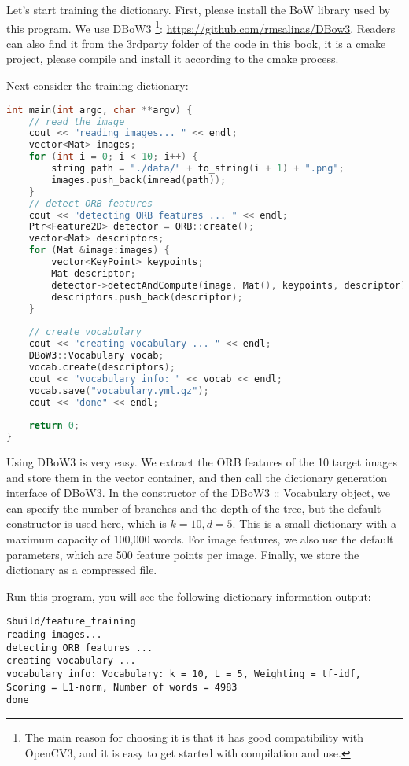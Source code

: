 Let's start training the dictionary. First, please install the BoW library used by this program. We use DBoW3 \footnote{The main reason for choosing it is that it has good compatibility with OpenCV3, and it is easy to get started with compilation and use.}: \url{https://github.com/rmsalinas/DBow3}. Readers can also find it from the 3rdparty folder of the code in this book, it is a cmake project, please compile and install it according to the cmake process.

Next consider the training dictionary:

\begin{lstlisting}[language=c++,caption=slambook2/ch11/feature\_training.cpp]
int main(int argc, char **argv) {
	// read the image 
	cout << "reading images... " << endl;
	vector<Mat> images;
	for (int i = 0; i < 10; i++) {
		string path = "./data/" + to_string(i + 1) + ".png";
		images.push_back(imread(path));
	}
	// detect ORB features
	cout << "detecting ORB features ... " << endl;
	Ptr<Feature2D> detector = ORB::create();
	vector<Mat> descriptors;
	for (Mat &image:images) {
		vector<KeyPoint> keypoints;
		Mat descriptor;
		detector->detectAndCompute(image, Mat(), keypoints, descriptor);
		descriptors.push_back(descriptor);
	}
	
	// create vocabulary 
	cout << "creating vocabulary ... " << endl;
	DBoW3::Vocabulary vocab;
	vocab.create(descriptors);
	cout << "vocabulary info: " << vocab << endl;
	vocab.save("vocabulary.yml.gz");
	cout << "done" << endl;
	
	return 0;
}
\end{lstlisting}
Using DBoW3 is very easy. We extract the ORB features of the 10 target images and store them in the vector container, and then call the dictionary generation interface of DBoW3. In the constructor of the DBoW3 :: Vocabulary object, we can specify the number of branches and the depth of the tree, but the default constructor is used here, which is $k = 10, d = 5 $. This is a small dictionary with a maximum capacity of 100,000 words. For image features, we also use the default parameters, which are 500 feature points per image. Finally, we store the dictionary as a compressed file.

Run this program, you will see the following dictionary information output:

\begin{lstlisting}
$build/feature_training
reading images...
detecting ORB features ...
creating vocabulary ...
vocabulary info: Vocabulary: k = 10, L = 5, Weighting = tf-idf, Scoring = L1-norm, Number of words = 4983
done
\end{lstlisting}

